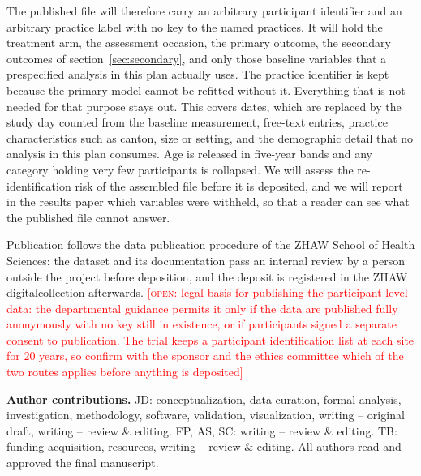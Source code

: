\documentclass[11pt,a4paper]{article}
\newcommand{\open}[1]{\textcolor{red}{[\textsc{open}: #1]}}
\begin{document}
The published file will therefore carry an arbitrary participant identifier
and an arbitrary practice label with no key to the named practices. It will
hold the treatment arm, the assessment occasion, the primary outcome, the
secondary outcomes of section~\ref{sec:secondary}, and only those baseline
variables that a prespecified analysis in this plan actually uses.
The practice identifier is kept because the primary model cannot be refitted
without it. Everything that is not needed for that purpose stays out. This
covers dates, which are replaced by the study day counted from the baseline
measurement, free-text entries, practice characteristics such as canton,
size or setting, and the demographic detail that no analysis in this plan
consumes. Age is released in five-year bands and any category holding very
few participants is collapsed. We will assess the re-identification risk of
the assembled file before it is deposited, and we will report in the results
paper which variables were withheld, so that a reader can see what the
published file cannot answer.

Publication follows the data publication procedure of the ZHAW School of
Health Sciences: the dataset and its documentation pass an internal review
by a person outside the project before deposition, and the deposit is
registered in the ZHAW digitalcollection afterwards. \open{legal basis for
publishing the participant-level data: the departmental guidance permits it
only if the data are published fully anonymously with no key still in
existence, or if participants signed a separate consent to publication. The
trial keeps a participant identification list at each site for 20 years, so
confirm with the sponsor and the ethics committee which of the two routes
applies before anything is deposited}

\textbf{Author contributions.} JD: conceptualization, data curation, formal
analysis, investigation, methodology, software, validation, visualization,
writing -- original draft, writing -- review \& editing. FP, AS, SC:
writing -- review \& editing. TB: funding acquisition, resources,
writing -- review \& editing. All authors read and approved the final
manuscript.

\clearpage


\end{document}
